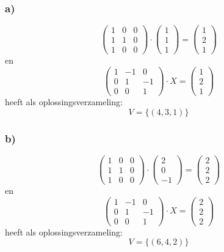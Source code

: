 \documentclass[10pt,a4paper]{article}
\begin{document}
\subsubsection*{a)}
\[
\begin{pmatrix}
1 & 0 & 0\\
1 & 1 & 0\\
1 & 0 & 0
\end{pmatrix}
\cdot
\begin{pmatrix}
1\\1\\1
\end{pmatrix}
=
\begin{pmatrix}
1\\2\\1
\end{pmatrix}
\]
en
\[
\begin{pmatrix}
1 & -1 & 0 \\
0 & 1 & -1 \\
0 & 0 & 1 
\end{pmatrix}
\cdot
X
=
\begin{pmatrix}
1\\2\\1
\end{pmatrix}
\]
heeft als oplossingsverzameling:
\[
V=\{(4,3,1)\}
\]
\subsubsection*{b)}
\[
\begin{pmatrix}
1 & 0 & 0\\
1 & 1 & 0\\
1 & 0 & 0
\end{pmatrix}
\cdot
\begin{pmatrix}
2\\0\\-1
\end{pmatrix}
=
\begin{pmatrix}
2\\2\\2
\end{pmatrix}
\]
en
\[
\begin{pmatrix}
1 & -1 & 0 \\
0 & 1 & -1 \\
0 & 0 & 1 
\end{pmatrix}
\cdot
X
=
\begin{pmatrix}
2\\2\\2
\end{pmatrix}
\]
heeft als oplossingsverzameling:
\[
V=\{(6,4,2)\}
\]
\end{document}
